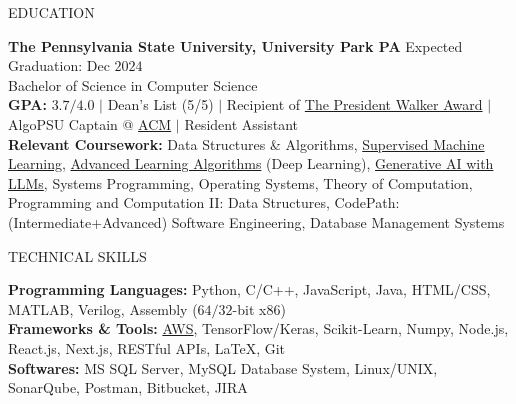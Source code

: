 \documentclass{resume} %
\begin{document}

\begin{rSection}{EDUCATION}

{\bf The Pennsylvania State University, University Park PA} \hfill {Expected Graduation: Dec $2024$}\\
{Bachelor of Science in Computer Science}\\
{\bf GPA:} $3.7/4.0$ $\vert$ Dean's List (5/5) $\vert$ Recipient of \href{https://awardsrecognition.psu.edu/student/undergraduate-scholastic-awards/}{The President Walker Award} $\vert$ AlgoPSU Captain @ \href{https://acm.psu.edu/algopsu/}{ACM} $\vert$ Resident Assistant\\
{\bf Relevant Coursework:} Data Structures \& Algorithms, \href{https://www.coursera.org/account/accomplishments/verify/JYX5UB5YP4YD}{Supervised Machine Learning}, \href{https://www.coursera.org/account/accomplishments/records/PBF4QN2KQL4Z}{Advanced Learning Algorithms} (Deep Learning), \href{https://www.coursera.org/account/accomplishments/verify/3W6HA4ZC7UTY}{Generative AI with LLMs}, Systems Programming, Operating Systems, Theory of Computation, Programming and Computation II: Data Structures, CodePath: (Intermediate+Advanced) Software Engineering, Database Management Systems
\end{rSection}


\begin{rSection}{TECHNICAL SKILLS}

{\bf Programming Languages:} Python, C/C++, JavaScript, Java, HTML/CSS, MATLAB, Verilog, Assembly ($64/32$-bit x$86$)\\
{\bf Frameworks \& Tools:} \href{https://www.coursera.org/account/accomplishments/verify/7L8L8YQTMCPZ}{AWS}, TensorFlow/Keras, Scikit-Learn, Numpy, Node.js, React.js, Next.js, RESTful APIs, \LaTeX, Git\\
{\bf Softwares:} MS SQL Server, MySQL Database System, Linux/UNIX, SonarQube, Postman, Bitbucket, JIRA

\end{rSection}
\end{document}
